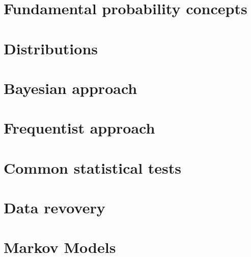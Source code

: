 \chapter{Fundamental probability concepts}


\chapter{Distributions}


\chapter{Bayesian approach}


\chapter{Frequentist approach}


\chapter{Common statistical tests}


\chapter{Data revovery}


\chapter{Markov Models}

